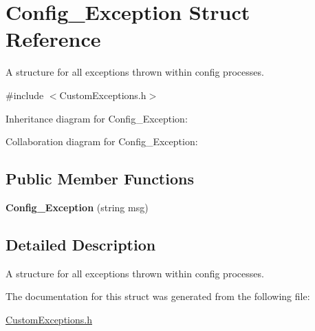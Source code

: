 \hypertarget{struct_config___exception}{}\section{Config\+\_\+\+Exception Struct Reference}
\label{struct_config___exception}


A structure for all exceptions thrown within config processes.  




{\ttfamily \#include $<$Custom\+Exceptions.\+h$>$}



Inheritance diagram for Config\+\_\+\+Exception\+:


Collaboration diagram for Config\+\_\+\+Exception\+:
\subsection*{Public Member Functions}
\begin{DoxyCompactItemize}
\item 
{\bfseries Config\+\_\+\+Exception} (string msg)\hypertarget{struct_config___exception_aaf23f4c3935e1ecf31791007d1eb734b}{}\label{struct_config___exception_aaf23f4c3935e1ecf31791007d1eb734b}

\end{DoxyCompactItemize}


\subsection{Detailed Description}
A structure for all exceptions thrown within config processes. 

The documentation for this struct was generated from the following file\+:\begin{DoxyCompactItemize}
\item 
\hyperlink{_custom_exceptions_8h}{Custom\+Exceptions.\+h}\end{DoxyCompactItemize}

